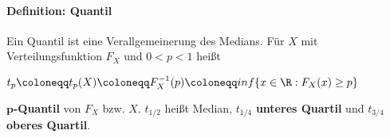 \paragraph{Definition: Quantil}
Ein Quantil ist eine Verallgemeinerung des Medians.
Für $X$ mit Verteilungsfunktion $F_X$ und $0<p<1$ heißt
\begin{tightcenter}
	$t_p\coloneqq t_p(X)\coloneqq F_{X}^{-1}(p)\coloneqq inf\{x\in\R:F_X(x)\geq p\}$
\end{tightcenter}
$\boldsymbol{p}$\textbf{-Quantil} von $F_X$ bzw. $X$. 
$t_{1/2}$ heißt Median, $t_{1/4}$ \textbf{unteres Quartil} und $t_{3/4}$ \textbf{oberes Quartil}.